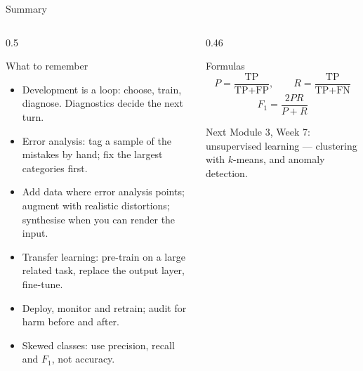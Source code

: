 \documentclass[aspectratio=169,10pt]{beamer}
\begin{document}
\begin{frame}{Summary}
  \begin{columns}[T,onlytextwidth]
    \begin{column}{0.5\textwidth}
      \begin{block}{What to remember}
        \footnotesize
        \begin{itemize}
          \item Development is a loop: choose, train, diagnose. Diagnostics decide the next
                turn.
          \item Error analysis: tag a sample of the mistakes by hand; fix the largest
                categories first.
          \item Add data where error analysis points; augment with realistic distortions;
                synthesise when you can render the input.
          \item Transfer learning: pre-train on a large related task, replace the output
                layer, fine-tune.
          \item Deploy, monitor and retrain; audit for harm before and after.
          \item Skewed classes: use precision, recall and $F_1$, not accuracy.
        \end{itemize}
      \end{block}
    \end{column}
    \begin{column}{0.46\textwidth}
      \begin{block}{Formulas}
        \[ P=\frac{\text{TP}}{\text{TP}+\text{FP}},\qquad R=\frac{\text{TP}}{\text{TP}+\text{FN}} \]
        \[ F_1=\frac{2PR}{P+R} \]
      \end{block}
      \begin{block}{Next}
        \footnotesize Module 3, Week 7: unsupervised learning --- clustering with $k$-means,
        and anomaly detection.
      \end{block}
    \end{column}
  \end{columns}
\end{frame}
\end{document}
